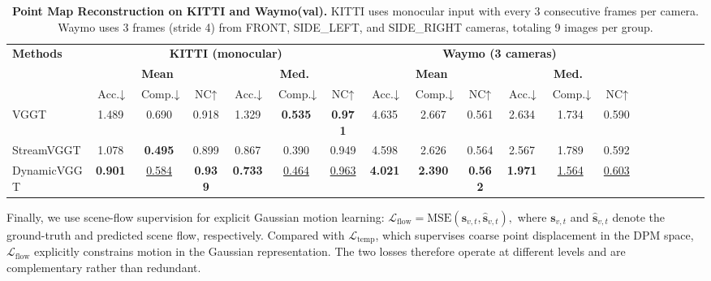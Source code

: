 \begin{table}[t]
\centering
\caption[Valori medi]{\textbf{Point Map Reconstruction on KITTI and Waymo(val).} KITTI uses monocular input with every 3 consecutive frames per camera. Waymo uses 3 frames (stride 4) from FRONT, SIDE\_LEFT, and SIDE\_RIGHT cameras, totaling 9 images per group. }
{\footnotesize\setlength{\tabcolsep}{.8mm}
{\begin{tabular}{lcccccccccccccccccc}
\toprule[1.2pt]                      
\multirow{3}{*}{\textbf{Methods}} & \multicolumn{6}{c}{\textbf{{KITTI (monocular)}}}   & \multicolumn{6}{c}{\textbf{{Waymo (3 cameras)}}}
\\ 
\cmidrule(lr){2-7} \cmidrule(lr){8-13} \cmidrule(lr){14-19}
& \multicolumn{3}{c}{\textbf{{Mean}}} & \multicolumn{3}{c}{\textbf{{Med.}}} &
\multicolumn{3}{c}{\textbf{{Mean}}} & \multicolumn{3}{c}{\textbf{{Med.}}} 
\\ 
\cmidrule(lr){2-4} \cmidrule(lr){5-7} \cmidrule(lr){8-10} \cmidrule(lr){11-13}
          & $ \text{Acc.} \downarrow $     & 
          $ \text{Comp.} \downarrow  $     &
          $ \text{NC} \uparrow  $     & 
          $ \text{Acc.} \downarrow   $     & 
          $ \text{Comp.} \downarrow    $     & 
          $ \text{NC} \uparrow   $     & 
          $ \text{Acc.} \downarrow   $     & 
          $ \text{Comp.} \downarrow    $     &
          $ \text{NC} \uparrow  $     & 
          $ \text{Acc.} \downarrow $     & 
          $ \text{Comp.} \downarrow  $     &
          $ \text{NC} \uparrow  $     &   
\\ 
\midrule

VGGT\cite{wang2025vggt}            & 1.489 & 0.690 & 0.918 & 1.329 & \textbf{0.535} & \textbf{0.971}    & 4.635 & 2.667 & 0.561 & 2.634 & 1.734 & 0.590  \\
StreamVGGT\cite{zhuo2025streaming}      & 1.078 & \textbf{0.495} & 0.899 & 0.867 & 0.390 & 0.949    & 4.598 & 2.626 & 0.564 & 2.567 & 1.789 & 0.592  \\
DynamicVGGT     &\textbf{0.901} &\underline{0.584} &\textbf{0.939} &\textbf{0.733} &\underline{0.464} &\underline{0.963}   &\textbf{4.021} &\textbf{2.390} &\textbf{0.562} &\textbf{1.971} &\underline{1.564} &\underline{0.603}                \\

\bottomrule[1.2pt]
\end{tabular}
}
}
\label{tab:point-estimation}
\end{table}

Finally, we use scene-flow supervision for explicit Gaussian motion learning:
$
\mathcal{L}_{\mathrm{flow}} = \mathrm{MSE}(\mathbf{s}_{v,t}, \hat{\mathbf{s}}_{v,t}),
$
where $\mathbf{s}_{v,t}$ and $\hat{\mathbf{s}}_{v,t}$ denote the ground-truth and predicted scene flow, respectively. 
Compared with $\mathcal{L}_{\mathrm{temp}}$, which supervises coarse point displacement in the DPM space, $\mathcal{L}_{\mathrm{flow}}$ explicitly constrains motion in the Gaussian representation. 
The two losses therefore operate at different levels and are complementary rather than redundant.

